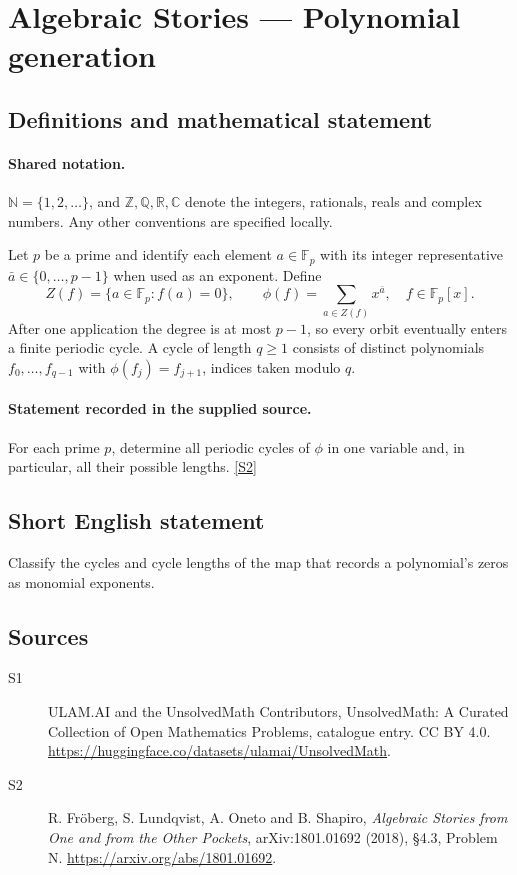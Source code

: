 \documentclass[11pt]{article}
\newcommand{\sref}[2]{\hyperlink{source:#1:#2}{[S#2]}}
\begin{document}
\section{Algebraic Stories — Polynomial generation}\label{statement}

\subsection{Definitions and mathematical statement}

\paragraph{Shared notation.}$\mathbb N=\{1,2,\ldots\}$, and $\mathbb Z,\mathbb Q,\mathbb R,\mathbb C$ denote the integers, rationals, reals and complex numbers. Any other conventions are specified locally.


Let $p$ be a prime and identify each element $a\in\mathbb F_p$ with its integer representative $\bar a\in\{0,\ldots,p-1\}$ when used as an exponent. Define
\[Z(f)=\{a\in\mathbb F_p:f(a)=0\},\qquad\phi(f)=\sum_{a\in Z(f)}x^{\bar a},\quad f\in\mathbb F_p[x].
\]
After one application the degree is at most $p-1$, so every orbit eventually enters a finite periodic cycle. A cycle of length $q\geq1$ consists of distinct polynomials $f_0,\ldots,f_{q-1}$ with $\phi(f_j)=f_{j+1}$, indices taken modulo $q$.
\paragraph{Statement recorded in the supplied source.}
For each prime $p$, determine all periodic cycles of $\phi$ in one variable and, in particular, all their possible lengths. \sref{statement}{2}
\subsection{Short English statement}
Classify the cycles and cycle lengths of the map that records a polynomial’s zeros as monomial exponents.
\subsection{Sources}
\begin{description}
\item[\hypertarget{source:statement:1}{S1}] ULAM.AI and the UnsolvedMath Contributors, UnsolvedMath: A Curated Collection of Open Mathematics Problems, catalogue entry. CC BY 4.0. \url{https://huggingface.co/datasets/ulamai/UnsolvedMath}.
\item[\hypertarget{source:statement:2}{S2}] R. Fröberg, S. Lundqvist, A. Oneto and B. Shapiro, \emph{Algebraic Stories from One and from the Other Pockets}, arXiv:1801.01692 (2018), §4.3, Problem N. \url{https://arxiv.org/abs/1801.01692}.
\end{description}
\label{end:statement}
\end{document}
